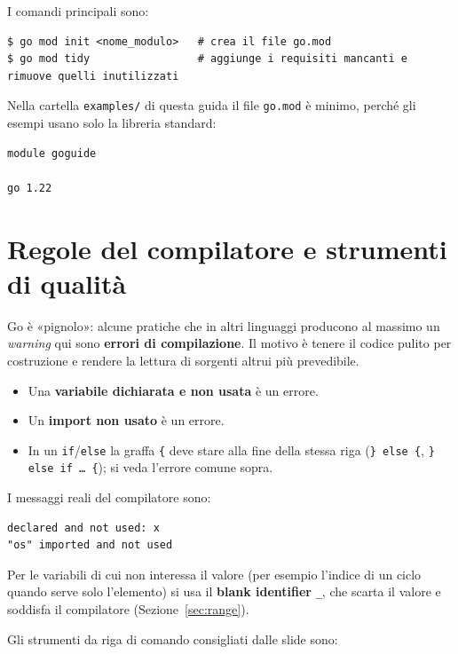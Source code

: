 \documentclass[11pt,a4paper]{report}
\newcommand{\cod}[1]{\texttt{#1}}
\begin{document}
I comandi principali sono:

\begin{lstlisting}[style=shell]
$ go mod init <nome_modulo>   # crea il file go.mod
$ go mod tidy                 # aggiunge i requisiti mancanti e rimuove quelli inutilizzati
\end{lstlisting}

Nella cartella \texttt{examples/} di questa guida il file \texttt{go.mod} è
minimo, perché gli esempi usano solo la libreria standard:

\begin{lstlisting}[style=shell,caption={\texttt{examples/go.mod}}]
module goguide

go 1.22
\end{lstlisting}

\section{Regole del compilatore e strumenti di qualità}\label{sec:strumenti}

Go è «pignolo»: alcune pratiche che in altri linguaggi producono al massimo un
\emph{warning} qui sono \textbf{errori di compilazione}. Il motivo è tenere il
codice pulito per costruzione e rendere la lettura di sorgenti altrui più
prevedibile.

\begin{itemize}
  \item Una \textbf{variabile dichiarata e non usata} è un errore.
  \item Un \textbf{import non usato} è un errore.
  \item In un \cod{if}/\cod{else} la graffa \cod{\{} deve stare alla fine della
        stessa riga (\cod{\} else \{}, \cod{\} else if \ldots\ \{}); si veda
        l'errore comune sopra.
\end{itemize}

I messaggi reali del compilatore sono:

\begin{lstlisting}[style=output]
declared and not used: x
"os" imported and not used
\end{lstlisting}

Per le variabili di cui non interessa il valore (per esempio l'indice di un ciclo
quando serve solo l'elemento) si usa il \textbf{blank identifier} \cod{\_}, che
scarta il valore e soddisfa il compilatore (Sezione~\ref{sec:range}).

Gli strumenti da riga di comando consigliati dalle slide sono:
\end{document}
